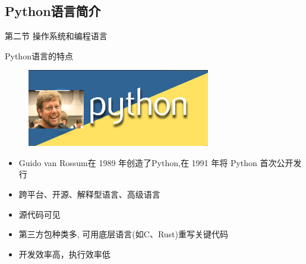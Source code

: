 \subsection{Python语言简介}

\begin{frame}[standout] 第二节 \quad 操作系统和编程语言 \end{frame}


\begin{frame}{Python语言的特点}
    \begin{figure}
        \centering
        \includegraphics[width=8cm]{Images/Python.jpg}
    \end{figure}
    \small{
        \begin{itemize}
            \item Guido van Rossum在 1989 年创造了Python,在 1991 年将 Python 首次公开发行
            \item 跨平台、开源、解释型语言、高级语言
            \item 源代码可见
            \item 第三方包种类多, 可用底层语言(如C、Rust)重写关键代码
            \item 开发效率高，执行效率低
        \end{itemize}
    }
\end{frame}





